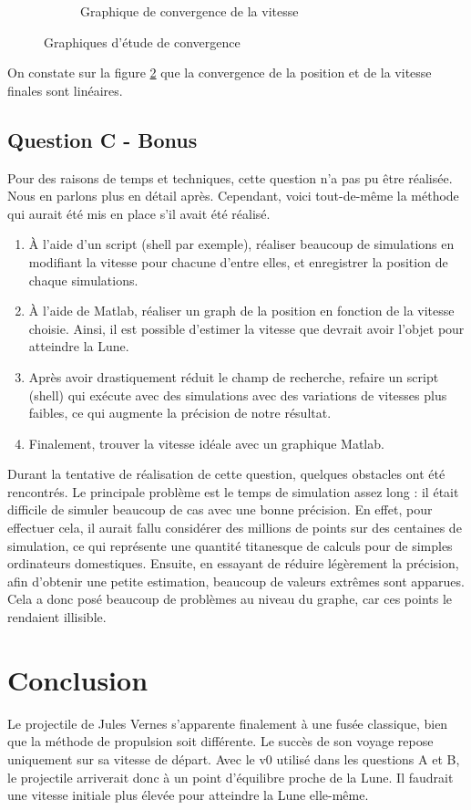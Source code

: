 \documentclass[a4paper,12pt,twoside]{article}
\begin{document}
\begin{figure}[h]
\begin{subfigure}[b]{0.45\textwidth}
		\caption{Graphique de convergence de la vitesse}
		\label{fig:B-vConv}
	\end{subfigure}
	\caption{Graphiques d'étude de convergence}
	\label{fig:B-conv}
\end{figure}

On constate sur la figure \ref{fig:B-conv} que la convergence de la position et de la vitesse finales sont linéaires.

\subsection{Question C - Bonus}
Pour des raisons de temps et techniques, cette question n'a pas pu être réalisée.
Nous en parlons plus en détail après.
Cependant, voici tout-de-même la méthode qui aurait été mis en place s'il avait été réalisé.
\begin{enumerate}
	\item À l'aide d'un script (shell par exemple), réaliser beaucoup de simulations en modifiant la vitesse pour chacune d'entre elles, et enregistrer la position de chaque simulations.
	\item À l'aide de Matlab, réaliser un graph de la position en fonction de la vitesse choisie. Ainsi, il est possible d'estimer la vitesse que devrait avoir l'objet pour atteindre la Lune.
	\item Après avoir drastiquement réduit le champ de recherche, refaire un script (shell) qui exécute avec des simulations avec des variations de vitesses plus faibles, ce qui augmente la précision de notre résultat.
	\item Finalement, trouver la vitesse idéale avec un graphique Matlab.
\end{enumerate}

Durant la tentative de réalisation de cette question, quelques obstacles ont été rencontrés.
Le principale problème est le temps de simulation assez long : 
il était difficile de simuler beaucoup de cas avec une bonne précision. 
En effet, pour effectuer cela, il aurait fallu considérer des millions de points sur des centaines de simulation, ce qui représente une quantité titanesque de calculs pour de simples ordinateurs domestiques.
Ensuite, en essayant de réduire légèrement la précision, afin d'obtenir une petite estimation, beaucoup de valeurs extrêmes sont apparues.
Cela a donc posé beaucoup de problèmes au niveau du graphe, car ces points le rendaient illisible.

\section{Conclusion}
Le projectile de Jules Vernes s'apparente finalement à une fusée classique, bien que la méthode de propulsion soit différente.
Le succès de son voyage repose uniquement sur sa vitesse de départ.
Avec le v0 utilisé dans les questions A et B, le projectile arriverait donc à un point d'équilibre proche de la Lune. Il faudrait une vitesse initiale plus élevée pour atteindre la Lune elle-même.
\end{document}
